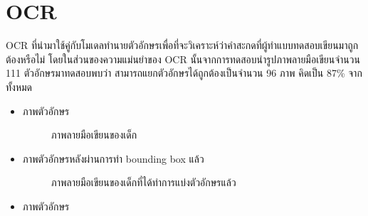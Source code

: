 \documentclass[12pt,oneside,openright,a4paper]{cpe-thai-project}
\begin{document}
\section{OCR }
  OCR ที่นำมาใช้คู่กับโมเดลทำนายตัวอักษรเพื่อที่จะวิเคราะห์ว่าคำสะกดที่ผู้ทำแบบทดสอบเขียนมาถูกต้องหรือไม่ โดยในส่วนของความแม่นยำของ OCR นั้นจากการทดสอบนำรูปภาพลายมือเขียนจำนวน 111 ตัวอักษรมาทดสอบพบว่า สามารถแยกตัวอักษรได้ถูกต้องเป็นจำนวน 96 ภาพ คิดเป็น 87\% จากทั้งหมด
\begin{itemize}
  \item ภาพตัวอักษร
  \begin{figure}[!h]\centering
    \setlength{\fboxrule}{0.2mm} %
    \setlength{\fboxsep}{1cm}
    \caption{ภาพลายมือเขียนของเด็ก}\label{fig:system}                  
   \end{figure}
   \item ภาพตัวอักษรหลังผ่านการทำ bounding box แล้ว
   \begin{figure}[!h]\centering
     \setlength{\fboxrule}{0.2mm} %
     \setlength{\fboxsep}{1cm}
     \caption{ภาพลายมือเขียนของเด็กที่ได้ทำการแบ่งตัวอักษรแล้ว}\label{fig:system}                  
    \end{figure}
    \newpage
    \item ภาพตัวอักษร
  \begin{figure}[!h]\centering
    \setlength{\fboxrule}{0.2mm} %

\end{figure}
\end{itemize}
\end{document}
